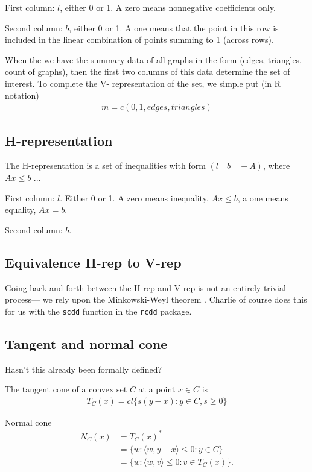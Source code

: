 \documentclass{amsbook}
\newcommand{\inner}[1]{\langle #1 \rangle}
\theoremstyle{definition}
\theoremstyle{remark}
\begin{document}
First column: $l$, either 0 or 1.  A zero means nonnegative coefficients only.    

Second column: $b$, either 0 or 1.  A one means that the point in this row is included 
in the linear combination of points summing to 1 (across rows).

When the we have the summary data of all graphs in the form (edges, triangles, count of graphs), then the 
first two columns of this data determine the set of interest.  To complete the V-
representation of the set, we simple put (in R notation)
\begin{align*}
m = c(0, 1, edges, triangles )
\end{align*}

\subsection{H-representation}

The H-representation is a set of inequalities with form $(l \quad b \quad -A)$, where
$Ax \leq b$ ... 

First column: $l$.  Either 0 or 1.  A zero means inequality, $Ax \leq b$, a one means 
equality, $Ax = b$.

Second column: $b$.  

\subsection{Equivalence H-rep to V-rep} 

Going back and forth between the H-rep and V-rep is not an entirely trivial process---
we rely upon the Minkowski-Weyl theorem \citep[Theorem 19.1]{Rockafellar:1970}.  
Charlie of course does this for us with the \texttt{scdd} function in the \texttt{rcdd} 
package.

\subsection{Tangent and normal cone}
Hasn't this already been formally defined?

The tangent cone of a convex set $C$ at a point $x \in C$ is
\begin{align*}
	T_C(x) = cl\{ s(y-x): y \in C, s \geq 0 \}
\end{align*}

Normal cone
\begin{align*}
	N_C(x) 	&= T_C(x)^* \\
			&= \{ w: \inner{ w, y-x } \leq 0: y \in C \}  \\
			&= \{ w: \inner{ w, v } \leq 0: v \in T_C(x) \}.
\end{align*}
\end{document}
